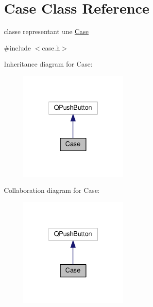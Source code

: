 \hypertarget{classCase}{\section{Case Class Reference}
\label{classCase}
}


classe representant une \hyperlink{classCase}{Case}  




{\ttfamily \#include $<$case.\+h$>$}



Inheritance diagram for Case\+:
\nopagebreak
\begin{figure}[H]
\begin{center}
\leavevmode
\includegraphics[width=154pt]{classCase__inherit__graph}
\end{center}
\end{figure}


Collaboration diagram for Case\+:
\nopagebreak
\begin{figure}[H]
\begin{center}
\leavevmode
\includegraphics[width=154pt]{classCase__coll__graph}
\end{center}
\end{figure}
